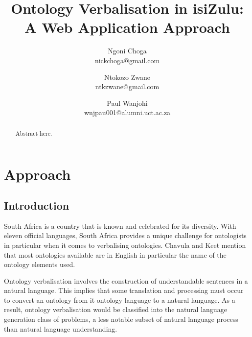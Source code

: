 \documentclass[11pt,a4paper]{article}
\begin{document}
\title{Ontology Verbalisation in isiZulu:\\ A Web Application Approach} \date{}
\author{Ngoni Choga\\ nickchoga@gmail.com
\and Ntokozo Zwane\\ ntkzwane@gmail.com
\and Paul Wanjohi\\ wnjpau001@alumni.uct.ac.za}

\chead{}
\rhead{\date{}}   %
\lfoot{}
\cfoot{\thepage}    %
\rfoot{}
\renewcommand{\headrulewidth}{0.0pt}   %

\maketitle
\thispagestyle{plain}  %

\begin{abstract}
	Abstract here.
\end{abstract}

\section{Approach}


\subsection{Introduction}
\label{ss:introduction}

South Africa is a country that is known and celebrated for its diversity. 
With eleven official languages, South Africa provides a unique challenge 
for ontologists in particular when it comes to verbalising ontologies.
Chavula and Keet mention that most ontologies available are in 
English in particular the name of the ontology elements used. %

Ontology verbalisation involves the construction of understandable sentences 
in a natural language. This implies that some translation and processing must
occur to convert an ontology from it ontology language to a natural language. 
As a result, ontology verbalisation would be classified into the natural 
language generation class of problems, a less notable subset of natural
language process than natural language understanding. %
\end{document}
